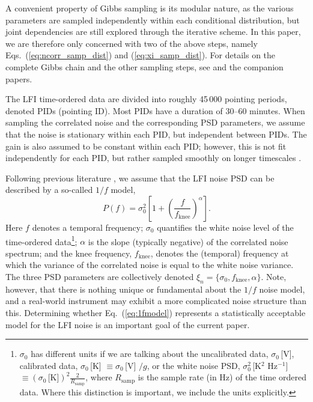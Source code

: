 \documentclass[twocolumn]{aa}
\begin{document}
A convenient property of Gibbs sampling is its modular nature, as the
various parameters are sampled independently within each conditional
distribution, but joint dependencies are still explored through the
iterative scheme. In this paper, we are therefore only concerned with
two of the above steps, namely Eqs.~(\ref{eq:ncorr_samp_dist}) and
(\ref{eq:xi_samp_dist}). For details on the complete Gibbs chain and the
other sampling steps, see \citet{bp01} and the companion papers.

The LFI time-ordered data are divided into roughly 45\,000 pointing
periods, denoted PIDs (pointing ID). Most PIDs have a duration of
30--60 minutes. When sampling the correlated noise and the
corresponding PSD parameters, we assume that the noise is stationary
within each PID, but independent between PIDs. The gain is also
assumed to be constant within each PID; however, this is not fit
independently for each PID, but rather sampled smoothly on longer
timescales \citep{bp09}.

Following previous literature
\citep{planck2013-p02,planck2014-a02,planck2016-l02}, we assume that
the LFI noise PSD can be described by a so-called $1/f$ model,
\begin{equation}
	P(f) = \sigma_0^2\left[1 +
          \left(\frac{f}{f_\mathrm{knee}}\right)^\alpha\right].
        \label{eq:1fmodel}
\end{equation} 
Here $f$ denotes a temporal frequency; $\sigma_0$ quantifies the white
noise level of the time-ordered data\footnote{$\sigma_0$ has different units if we are talking about the uncalibrated data, $\sigma_0$\,[V], calibrated data, $\sigma_0$\,[K] $\equiv \sigma_0$\,[V] $/ g$, or the white noise PSD, $\sigma_0^2$\,[K${}^2$ Hz${}^{-1}$] $\equiv \left(\sigma_0\right.$\,[K]$\left. \right)^2 \frac{2}{R_\mathrm{samp}}$, where $R_\mathrm{samp}$ is the sample rate (in Hz) of the time ordered data. Where this distinction is important, we include the units explicitly.}; $\alpha$ is the slope (typically negative) of the correlated
noise spectrum; and the knee frequency, $f_\mathrm{knee}$, denotes the
(temporal) frequency at which the variance of the correlated noise is
equal to the white noise variance. The three PSD parameters are
collectively denoted $\xi_n = \{ \sigma_0, f_\mathrm{knee},
\alpha\}$. Note, however, that there is nothing unique or fundamental
about the $1/f$ noise model, and a real-world instrument may exhibit a
more complicated noise structure than this. Determining whether
Eq.~(\ref{eq:1fmodel}) represents a statistically acceptable model
for the LFI noise is an important goal of the current paper.
\end{document}
